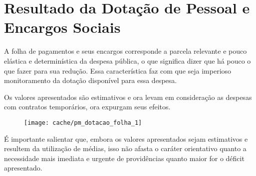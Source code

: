 
\section[Dotação de Pessoal e Encargos Sociais]{Resultado da Dotação de Pessoal e Encargos Sociais}

A folha de pagamentos e seus encargos corresponde a parcela relevante e pouco elástica e determinística da despesa pública, o que significa dizer que há pouco o que fazer para sua redução. Essa característica faz com que seja imperioso monitoramento da dotação disponível para essa despesa.



Os valores apresentados são estimativos e ora levam em consideração as despesas com contratos temporários, ora expurgam seus efeitos.

\begin{figure}[H]
\center
\texttt{[image: cache/pm\_dotacao\_folha\_1]}
\end{figure}

É importante salientar que, embora os valores apresentados sejam estimativos e resultem da utilização de médias, isso não afasta o caráter orientativo quanto a necessidade mais imediata e urgente de providências quanto maior for o déficit apresentado.